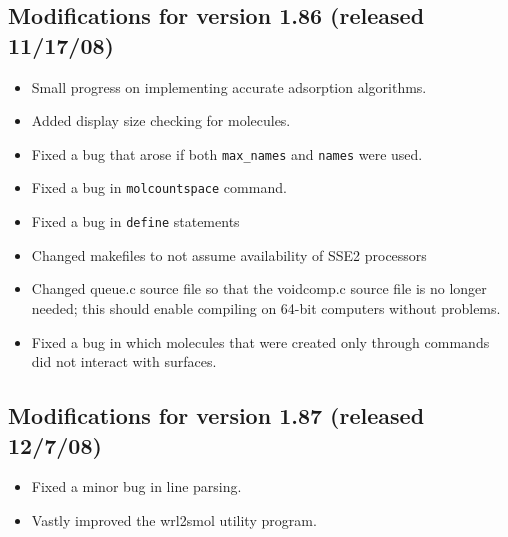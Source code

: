 \documentclass {scrbook}
\newcommand {\ttt} {\texttt}
\begin{document}
\subsection{Modifications for version 1.86 (released 11/17/08)}
\begin{itemize}
\item Small progress on implementing accurate adsorption algorithms.
\item Added display size checking for molecules.
\item Fixed a bug that arose if both \ttt{max\_names} and \ttt{names} were used.
\item Fixed a bug in \ttt{molcountspace} command.
\item Fixed a bug in \ttt{define} statements
\item Changed makefiles to not assume availability of SSE2 processors
\item Changed queue.c source file so that the voidcomp.c source file is no longer needed; this should enable compiling on 64-bit computers without problems.
\item Fixed a bug in which molecules that were created only through commands did not interact with surfaces.
\end{itemize}

\subsection{Modifications for version 1.87 (released 12/7/08)}
\begin{itemize}
\item Fixed a minor bug in line parsing.
\item Vastly improved the wrl2smol utility program.
\end{itemize}
\end{document}
